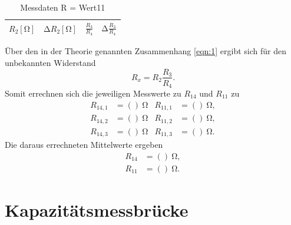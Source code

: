 \begin{table}
  \centering
  \caption{Messdaten R = Wert11}
  \label{tab:2}
  \begin{tabular}{c c c c}
    \toprule
    {$R_2 [\si{\ohm}]$} & {$\increment R_2 [\si{\ohm}]$} & {$\frac{R_3}{R_4}$} & {$\increment \frac{R_3}{R_4}$} \\
    \midrule
    
    \bottomrule
  \end{tabular}
\end{table}
Über den in der Theorie genannten Zusammenhang \ref{eqn:1} ergibt sich für den unbekannten Widerstand
\begin{equation}
  R_x = R_2 \frac{R_3}{R_4}.
\end{equation}
Somit errechnen sich die jeweiligen Messwerte zu $R_{14}$ und $R_{11}$ zu
\begin{align}
  R_{14,1}   &= ()\:\si{\ohm} & R_{11,1} &= ()\:\si{\ohm},\\
  R_{14,2}   &= ()\:\si{\ohm} & R_{11,2} &= ()\:\si{\ohm},\\
  R_{14,3}   &= ()\:\si{\ohm} & R_{11,3} &= ()\:\si{\ohm}.
\end{align}
Die daraus errechneten Mittelwerte ergeben
\begin{align}
  R_{14}   &= ()\:\si{\ohm},\\
  R_{11}   &= ()\:\si{\ohm}.
\end{align}

\section{Kapazitätsmessbrücke}
